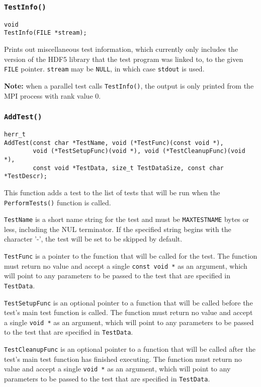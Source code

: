 \documentclass[../HDF5_RFC.tex]{subfiles}
\begin{document}
\subsubsection{\texttt{TestInfo()}}

\begin{verbatim}
void
TestInfo(FILE *stream);
\end{verbatim}

Prints out miscellaneous test information, which currently only includes the version of the HDF5
library that the test program was linked to, to the given \texttt{FILE} pointer. \texttt{stream} may be \texttt{NULL}, in which case \texttt{stdout} is used.

\textbf{Note:} when a parallel test calls \texttt{TestInfo()}, the output is only printed from the MPI
process with rank value 0.

\subsubsection{\texttt{AddTest()}}

\begin{verbatim}
herr_t
AddTest(const char *TestName, void (*TestFunc)(const void *),
        void (*TestSetupFunc)(void *), void (*TestCleanupFunc)(void *),
        const void *TestData, size_t TestDataSize, const char *TestDescr);
\end{verbatim}

This function adds a test to the list of tests that will be run when the \texttt{PerformTests()}
function is called.

\texttt{TestName} is a short name string for the test and must be \texttt{MAXTESTNAME} bytes or less,
including the NUL terminator. If the specified string begins with the character '-', the test will
be set to be skipped by default.

\texttt{TestFunc} is a pointer to the function that will be called for the test. The function must
return no value and accept a single \texttt{const void *} as an argument, which will point to any
parameters to be passed to the test that are specified in \texttt{TestData}.

\texttt{TestSetupFunc} is an optional pointer to a function that will be called before the test's
main test function is called. The function must return no value and accept a single \texttt{void *}
as an argument, which will point to any parameters to be passed to the test that are specified in
\texttt{TestData}.

\texttt{TestCleanupFunc} is an optional pointer to a function that will be called after the test's
main test function has finished executing. The function must return no value and accept a single
\texttt{void *} as an argument, which will point to any parameters to be passed to the test that are
specified in \texttt{TestData}.
\end{document}
